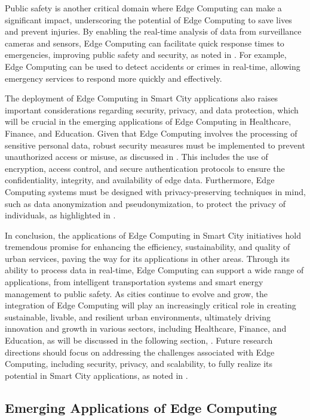 \documentclass[11pt,a4paper]{article}
\begin{document}
Public safety is another critical domain where Edge Computing can make a significant impact, underscoring the potential of Edge Computing to save lives and prevent injuries. By enabling the real-time analysis of data from surveillance cameras and sensors, Edge Computing can facilitate quick response times to emergencies, improving public safety and security, as noted in \cite{arxiv:2111.10076}. For example, Edge Computing can be used to detect accidents or crimes in real-time, allowing emergency services to respond more quickly and effectively.

The deployment of Edge Computing in Smart City applications also raises important considerations regarding security, privacy, and data protection, which will be crucial in the emerging applications of Edge Computing in Healthcare, Finance, and Education. Given that Edge Computing involves the processing of sensitive personal data, robust security measures must be implemented to prevent unauthorized access or misuse, as discussed in \cite{arxiv:2206.07164}. This includes the use of encryption, access control, and secure authentication protocols to ensure the confidentiality, integrity, and availability of edge data. Furthermore, Edge Computing systems must be designed with privacy-preserving techniques in mind, such as data anonymization and pseudonymization, to protect the privacy of individuals, as highlighted in \cite{arxiv:2206.07164}.

In conclusion, the applications of Edge Computing in Smart City initiatives hold tremendous promise for enhancing the efficiency, sustainability, and quality of urban services, paving the way for its applications in other areas. Through its ability to process data in real-time, Edge Computing can support a wide range of applications, from intelligent transportation systems and smart energy management to public safety. As cities continue to evolve and grow, the integration of Edge Computing will play an increasingly critical role in creating sustainable, livable, and resilient urban environments, ultimately driving innovation and growth in various sectors, including Healthcare, Finance, and Education, as will be discussed in the following section, \cite{arxiv:1701.01090}. Future research directions should focus on addressing the challenges associated with Edge Computing, including security, privacy, and scalability, to fully realize its potential in Smart City applications, as noted in \cite{arxiv:1911.02794}.


\subsection{Emerging Applications of Edge Computing}
\end{document}
